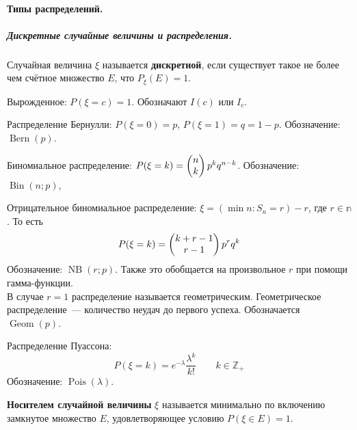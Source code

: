 \documentclass{article}
\begin{document}
    \paragraph{Типы распределений.}
    \subparagraph{Дискретные случайные величины и распределения.}
    \begin{definition}
        Случайная величина $\xi$ называется \textbf{дискретной}, если существует такое не более чем счётное множество $E$, что $P_\xi(E)=1$.
    \end{definition}
    \begin{example}
        Вырожденное: $P(\xi=c)=1$. Обозначают $I(c)$ или $I_c$.
    \end{example}
    \begin{example}
        \label{Распределение Бернулли}
        \label{Bern}
        Распределение Бернулли: $P(\xi=0)=p$, $P(\xi=1)=q=1-p$. Обозначение: $\operatorname{Bern}(p)$.
    \end{example}
    \begin{example}
        \label{Биномиальное распределение}
        \label{Bin}
        Биномиальное распределение: $P(\xi=k)=\left(\begin{matrix}n\\k\end{matrix}\right) p^kq^{n-k}$. Обозначение: $\operatorname{Bin}(n;p)$,
    \end{example}
    \begin{example}
        \label{Отрицательное биномиальное распределение}
        \label{NB}
        \label{Геометрическое распределение}
        \label{Geom}
        Отрицательное биномиальное распределение: $\xi=(\min n:S_n=r)-r$, где $r\in\mathbb n$. То есть
        $$
        P(\xi=k)=\left(\begin{matrix}k+r-1\\r-1\end{matrix}\right)p^{r}q^{k}
        $$
        Обозначение: $\operatorname{NB}(r;p)$. Также это обобщается на произвольное $r$ при помощи гамма-функции.\\
        В случае $r=1$ распределение называется геометрическим. Геометрическое распределение~--- количество неудач до первого успеха. Обозначается $\operatorname{Geom}(p)$.
    \end{example}
    \begin{example}
        \label{Распределение Пуассона}
        \label{Pois}
        Распределение Пуассона:
        $$
        P(\xi=k)=e^{-\lambda}\frac{\lambda^k}{k!}\qquad k\in\mathbb Z_+
        $$
        Обозначение: $\operatorname{Pois}(\lambda)$.
    \end{example}
    \begin{definition}
        \textbf{Носителем случайной величины} $\xi$ называется минимально по включению замкнутое множество $E$, удовлетворяющее условию $P(\xi\in E)=1$.
    \end{definition}
\end{document}

